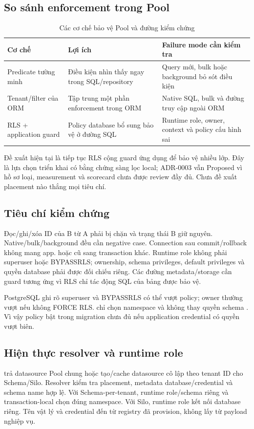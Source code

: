 \subsection{So sánh enforcement trong Pool}
\begin{table}[htbp]
\centering\caption{Các cơ chế bảo vệ Pool và đường kiểm chứng}\label{tab:n2-enforcement}
\begin{tabularx}{\textwidth}{P{.24\textwidth}XX}
\toprule Cơ chế & Lợi ích & Failure mode cần kiểm tra \\
\midrule
Predicate tường minh & Điều kiện nhìn thấy ngay trong SQL\slash repository & Query mới, bulk hoặc background bỏ sót điều kiện \\
Tenant\slash filter của ORM & Tập trung một phần enforcement trong ORM & Native SQL, bulk và đường truy cập ngoài ORM \\
RLS + application guard & Policy database bổ sung bảo vệ ở đường SQL & Runtime role, owner, context và policy cấu hình sai \\
\bottomrule\end{tabularx}
\end{table}
Đề xuất hiện tại là tiếp tục RLS cộng guard ứng dụng để bảo vệ nhiều lớp. Đây là lựa chọn triển khai có bằng chứng sàng lọc local; ADR-0003 vẫn Proposed vì hồ sơ loại, measurement và scorecard chưa được review đầy đủ. Chưa đề xuất placement nào thắng mọi tiêu chí.

\subsection{Tiêu chí kiểm chứng}
Đọc\slash ghi\slash xóa ID của B từ A phải bị chặn và trạng thái B giữ nguyên. Native\slash bulk\slash background đều cần negative case. Connection sau commit\slash rollback không mang app. hoặc  cũ sang transaction khác. Runtime role không phải superuser hoặc BYPASSRLS; ownership, schema privileges, default privileges và quyền database phải được đối chiếu riêng. Các đường metadata\slash storage cần guard tương ứng vì RLS chỉ tác động SQL của bảng được bảo vệ.

PostgreSQL ghi rõ superuser và BYPASSRLS có thể vượt policy; owner thường vượt nếu không FORCE RLS.  chỉ chọn namespace và không thay quyền schema \citep{postgresql2026rls,postgresqlSchemas}. Vì vậy policy bật trong migration chưa đủ nếu application credential có quyền vượt biên.

\subsection{Hiện thực resolver và runtime role}
 trả datasource Pool chung hoặc tạo\slash cache datasource cô lập theo tenant ID cho Schema\slash Silo. Resolver kiểm tra placement, metadata database\slash credential và schema name hợp lệ. Với Schema-per-tenant, runtime role\slash schema riêng và  transaction-local chọn đúng namespace. Với Silo, runtime role kết nối database riêng. Tên vật lý và credential đến từ registry đã provision, không lấy từ payload nghiệp vụ.

